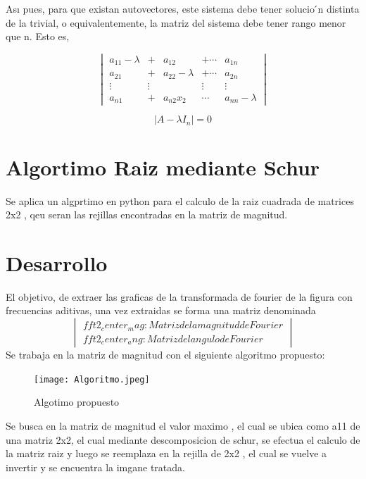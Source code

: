 \documentclass[Spanish,12pt,doublespace,german,letterpaper]{article}
\begin{document}
Ası pues, para que existan autovectores, este sistema debe tener solucio ́n distinta de la trivial, o equivalentemente, la matriz del sistema debe tener rango menor que n. 
Esto es,

\begin{equation}
\begin{vmatrix}
  a_{11}-\lambda    & + & a_{12}          & +\cdots & a_{1n}       \\
  a_{21}            & + & a_{22}-\lambda  & +\cdots & a_{2n}       \\
 \vdots & \vdots        &        & \vdots & \vdots \\
  a_{n1}             & + & a_{n2}x_2   & \cdots & a_{nn}-\lambda 
\end{vmatrix}
\end{equation}

$$|A -\lambda I_n|=0$$
\section{Algortimo Raiz mediante Schur}
Se aplica un algprtimo en python para el calculo de la raiz cuadrada de matrices 2x2 , qeu seran las rejillas encontradas en la matriz de magnitud. 

\section{Desarrollo }
El objetivo, de extraer las graficas de la transformada de fourier de la figura con frecuencias aditivas, una vez extraidas se forma una matriz denominada 
\begin{equation}
\begin{vmatrix}
fft2_center_mag:Matriz dela magnitud de Fourier \\
fft2_center_ang :Matriz del angulo de Fourier 
\end{vmatrix}
\end{equation}
Se trabaja en la matriz de magnitud con el siguiente algoritmo propuesto:
\begin{figure}[h]
\begin{center}
\texttt{[image: Algoritmo.jpeg]}
\caption{Algotimo propuesto}
\label{Algoritmo Propuesto}
\end{center}
\end{figure}
Se busca en la matriz de magnitud el valor maximo , el cual se ubica como a11 de una matriz 2x2, el cual mediante descomposicion de schur, se efectua 
el calculo de la matriz raiz y luego se reemplaza en la rejilla de 2x2 , el  cual se vuelve a invertir y se encuentra la imgane tratada.

\end{document}
